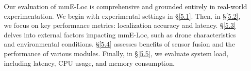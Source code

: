 



Our evaluation of mmE-Loc is comprehensive and grounded entirely in real-world experimentation.  
We begin with experimental settings in §\ref{5.1}. 
Then, in §\ref{5.2}, we focus on key performance metrics: localization accuracy and latency. 
§\ref{5.3} delves into external factors impacting mmE-Loc, such as drone characteristics and environmental conditions. 
§\ref{5.4} assesses benefits of sensor fusion and the performance of various modules. 
Finally, in §\ref{5.5}, we evaluate system load, including latency, CPU usage, and memory consumption.



